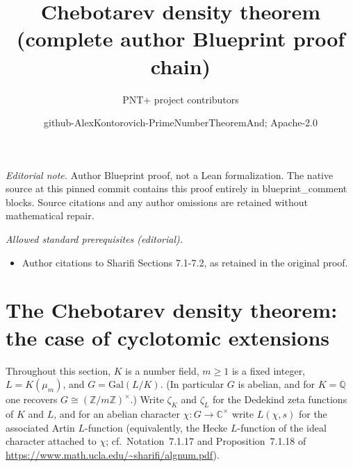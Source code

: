 \documentclass[10pt,a4paper]{article}
\title{Chebotarev density theorem (complete author Blueprint proof chain)}
\author{PNT+ project contributors}
\date{github-AlexKontorovich-PrimeNumberTheoremAnd; Apache-2.0}
\theoremstyle{definition}
\begin{document}
\maketitle
\noindent\textit{Editorial note.} Author Blueprint proof, not a Lean formalization. The native source at this pinned commit contains this proof entirely in blueprint\_comment blocks. Source citations and any author omissions are retained without mathematical repair.\par\medskip
\noindent\textit{Allowed standard prerequisites (editorial).}\begin{itemize}
\item Author citations to Sharifi Sections 7.1-7.2, as retained in the original proof.
\end{itemize}\medskip
\section{The Chebotarev density theorem: the case of cyclotomic extensions}

Throughout this section, $K$ is a number field, $m \geq 1$ is a fixed integer,
$L = K(\mu_m)$, and $G = \mathrm{Gal}(L/K)$.  (In particular $G$ is abelian, and for
$K=\mathbb{Q}$ one recovers $G \cong (\mathbb{Z}/m\mathbb{Z})^\times$.)
Write $\zeta_K$ and $\zeta_L$ for the Dedekind zeta functions of $K$ and $L$, and for
an abelian character $\chi : G \to \mathbb{C}^\times$ write $L(\chi,s)$ for the associated
Artin $L$-function (equivalently, the Hecke $L$-function of the ideal character attached to
$\chi$; cf.\ Notation~7.1.17 and Proposition~7.1.18 of
\url{https://www.math.ucla.edu/~sharifi/algnum.pdf}).
\end{document}
